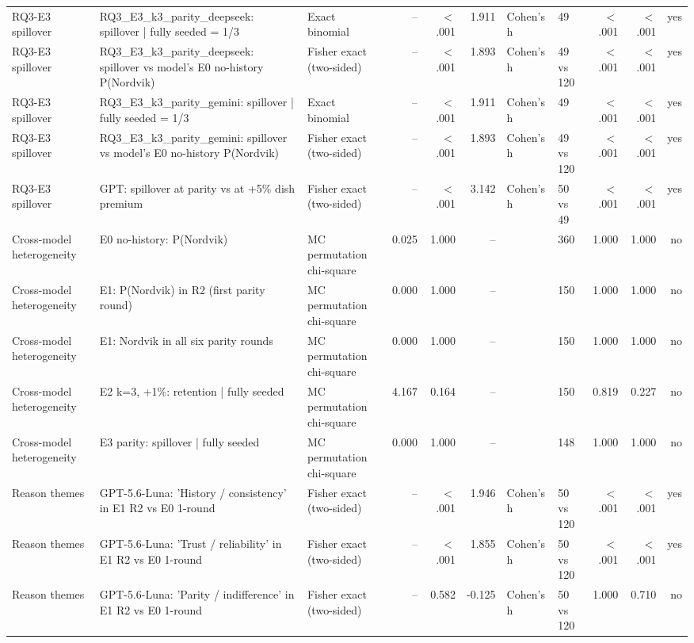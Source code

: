 \begin{table}[htbp]
\begin{tabular}{lllrrrllrrr}
RQ3-E3 spillover & RQ3\_E3\_k3\_parity\_deepseek: spillover | fully seeded = 1/3 & Exact binomial & -- & $<$.001 & 1.911 & Cohen's h & 49 & $<$.001 & $<$.001 & yes \\
RQ3-E3 spillover & RQ3\_E3\_k3\_parity\_deepseek: spillover vs model's E0 no-history P(Nordvik) & Fisher exact (two-sided) & -- & $<$.001 & 1.893 & Cohen's h & 49 vs 120 & $<$.001 & $<$.001 & yes \\
RQ3-E3 spillover & RQ3\_E3\_k3\_parity\_gemini: spillover | fully seeded = 1/3 & Exact binomial & -- & $<$.001 & 1.911 & Cohen's h & 49 & $<$.001 & $<$.001 & yes \\
RQ3-E3 spillover & RQ3\_E3\_k3\_parity\_gemini: spillover vs model's E0 no-history P(Nordvik) & Fisher exact (two-sided) & -- & $<$.001 & 1.893 & Cohen's h & 49 vs 120 & $<$.001 & $<$.001 & yes \\
RQ3-E3 spillover & GPT: spillover at parity vs at +5\% dish premium & Fisher exact (two-sided) & -- & $<$.001 & 3.142 & Cohen's h & 50 vs 49 & $<$.001 & $<$.001 & yes \\
Cross-model heterogeneity & E0 no-history: P(Nordvik) & MC permutation chi-square & 0.025 & 1.000 & -- &  & 360 & 1.000 & 1.000 & no \\
Cross-model heterogeneity & E1: P(Nordvik) in R2 (first parity round) & MC permutation chi-square & 0.000 & 1.000 & -- &  & 150 & 1.000 & 1.000 & no \\
Cross-model heterogeneity & E1: Nordvik in all six parity rounds & MC permutation chi-square & 0.000 & 1.000 & -- &  & 150 & 1.000 & 1.000 & no \\
Cross-model heterogeneity & E2 k=3, +1\%: retention | fully seeded & MC permutation chi-square & 4.167 & 0.164 & -- &  & 150 & 0.819 & 0.227 & no \\
Cross-model heterogeneity & E3 parity: spillover | fully seeded & MC permutation chi-square & 0.000 & 1.000 & -- &  & 148 & 1.000 & 1.000 & no \\
Reason themes & GPT-5.6-Luna: 'History / consistency' in E1 R2 vs E0 1-round & Fisher exact (two-sided) & -- & $<$.001 & 1.946 & Cohen's h & 50 vs 120 & $<$.001 & $<$.001 & yes \\
Reason themes & GPT-5.6-Luna: 'Trust / reliability' in E1 R2 vs E0 1-round & Fisher exact (two-sided) & -- & $<$.001 & 1.855 & Cohen's h & 50 vs 120 & $<$.001 & $<$.001 & yes \\
Reason themes & GPT-5.6-Luna: 'Parity / indifference' in E1 R2 vs E0 1-round & Fisher exact (two-sided) & -- & 0.582 & -0.125 & Cohen's h & 50 vs 120 & 1.000 & 0.710 & no \\

\end{tabular}
\end{table}
